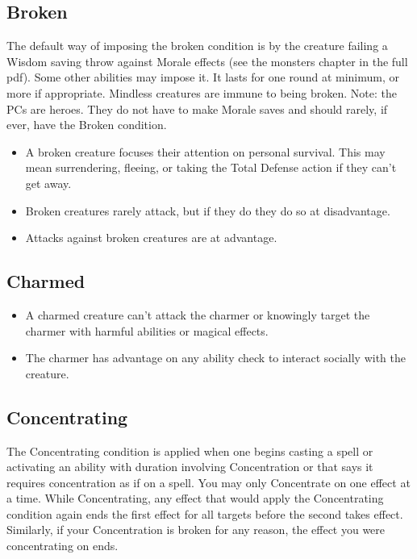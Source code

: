 \subsection{Broken\label{condition:broken}}
The default way of imposing the broken condition is by the creature failing a Wisdom saving throw against Morale effects (see the monsters chapter in the full pdf). Some other abilities may impose it. It lasts for one round at minimum, or more if appropriate. Mindless creatures are immune to being broken. Note: the PCs are heroes. They do not have to make Morale saves and should rarely, if ever, have the Broken condition.
\begin{itemize}
	\item A broken creature focuses their attention on personal survival. This may mean surrendering, fleeing, or taking the Total Defense action if they can't get away.
	\item Broken creatures rarely attack, but if they do they do so at disadvantage.
	\item Attacks against broken creatures are at advantage.
\end{itemize}


\subsection{Charmed\label{condition:charmed}}
\begin{itemize}
\item A charmed creature can't attack the charmer or knowingly target the charmer with harmful abilities or magical effects.
\item The charmer has advantage on any ability check to interact socially with the creature.
\end{itemize}

\subsection{Concentrating\label{condition:concentrating}}
The Concentrating condition is applied when one begins casting a spell or activating an ability with duration involving Concentration or that says it requires concentration as if on a spell. You may only Concentrate on one effect at a time. While Concentrating, any effect that would apply the Concentrating condition again ends the first effect for all targets before the second takes effect. Similarly, if your Concentration is broken for any reason, the effect you were concentrating on ends.

